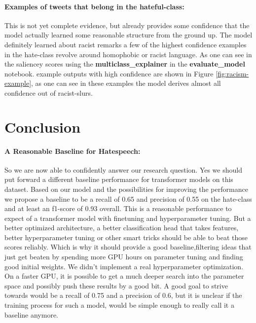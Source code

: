 \documentclass[11pt,a4paper]{article}
\begin{document}
\paragraph{Examples of tweets that belong in the hateful-class:}
\begin{center}
\newline
\end{center}

This is not yet complete evidence, but already provides some confidence that the model actually learned some reasonable structure from the ground up.
The model definitely learned about racist remarks a few of the highest confidence examples in the hate-class revolve around homophobic or racist language.
As one can see in the saliencey scores using the \textbf{multiclass\_explainer} in the \textbf{evaluate\_model} notebook.
example outputs with high confidence are shown in Figure \ref{fig:racism-example},
as one can see in these examples the model derives almost all confidence out of racist-slurs.

\newpage
\section{Conclusion}
\paragraph{A Reasonable Baseline for Hatespeech:}
So we are now able to confidently answer our research question.
Yes we should put forward a different baseline performance for transformer models on this dataset.
Based on our model and the possibilities for improving the performance we propose a baseline to be 
a recall of 0.65 and precision of 0.55 on the hate-class and at least an f1-score of 0.93 overall.
This is a reasonable performance to expect of a transformer model with finetuning
and hyperparameter tuning.
But a better optimized architecture, a better classification head that takes features, better hyperparameter tuning or other smart tricks
should be able to beat those scores reliably.
Which is why it should provide a good baseline,filtering ideas that just get beaten by spending more GPU hours on parameter tuning and finding good initial weights.
We didn't implement a real hyperparameter optimization.
On a faster GPU, it is possible to get a much deeper search into the parameter space and possibly push these results by a good bit.
A good goal to strive towards would be a recall of 0.75 and a precision of 0.6, but it is unclear if the training process for such a model, would 
be simple enough to really call it a baseline anymore.
\end{document}
